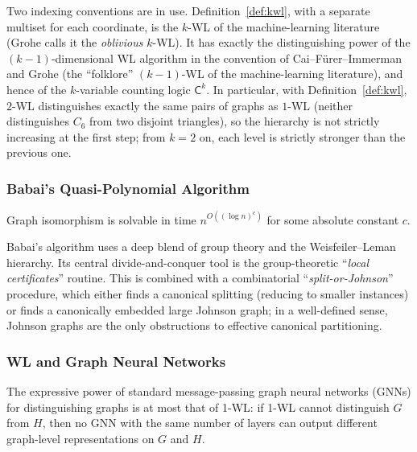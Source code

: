 \begin{remark}
Two indexing conventions are in use. Definition~\ref{def:kwl}, with a
separate multiset for each coordinate, is the $k$-WL of the
machine-learning literature (Grohe calls it the \emph{oblivious}
$k$-WL). It has exactly the distinguishing power of the
$(k-1)$-dimensional WL algorithm in the convention of
Cai--F\"urer--Immerman and Grohe (the ``folklore'' $(k-1)$-WL of the
machine-learning literature), and hence of the $k$-variable counting
logic $\mathsf C^{k}$. In particular, with Definition~\ref{def:kwl},
$2$-WL distinguishes exactly the same pairs of graphs as $1$-WL
(neither distinguishes $C_6$ from two disjoint triangles), so the
hierarchy is not strictly increasing at the first step; from $k = 2$
on, each level is strictly stronger than the previous one.
\end{remark}

\subsubsection{Babai's Quasi-Polynomial Algorithm}

\begin{theorem}[Babai, 2015--2017]\label{thm:babai}
Graph isomorphism is solvable in time $n^{O((\log n)^c)}$ for some
absolute constant $c$.
\end{theorem}

\begin{remark}
Babai's algorithm uses a deep blend of group theory and the
Weisfeiler--Leman hierarchy. Its central divide-and-conquer tool is
the group-theoretic ``\emph{local certificates}'' routine. This is
combined with a combinatorial ``\emph{split-or-Johnson}'' procedure,
which either finds a canonical splitting (reducing to smaller
instances) or finds a canonically embedded large Johnson graph; in a
well-defined sense, Johnson graphs are the only obstructions to
effective canonical partitioning.
\end{remark}

\subsubsection{WL and Graph Neural Networks}

\begin{theorem}\label{thm:gnnwl}
The expressive power of standard message-passing graph neural networks
(GNNs) for distinguishing graphs is at most that of 1-WL: if 1-WL
cannot distinguish $G$ from $H$, then no GNN with the same number of
layers can output different graph-level representations on $G$ and
$H$.
\end{theorem}

